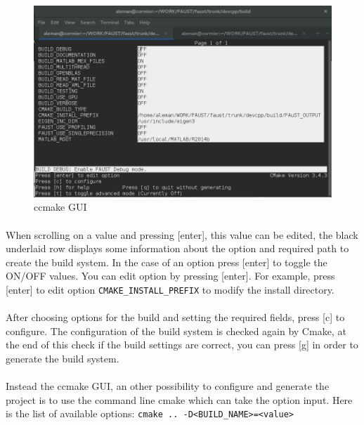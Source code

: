 \begin{itemize}
\begin{figure}[!h] %
\centering
\includegraphics[scale=0.5]{images/ccmake.jpg}
\caption{ccmake GUI}
\label{fig:ccmake}
\end{figure}

\paragraph{}When scrolling on a value and pressing [enter], this value can be edited, the black underlaid row displays some information about the option and required path to create the build system. In the case of an option press [enter] to toggle the ON/OFF values. You can edit option by pressing [enter]. For example, press [enter] to edit option \texttt{CMAKE\_INSTALL\_PREFIX} to modify the install directory. 
\paragraph{}After choosing options for the build and setting the required fields, press [c] to configure. The configuration of the build system is checked again by Cmake, at the end of this check if the build settings are correct, you can press [g] in order to generate the build system.

\paragraph{} Instead the ccmake GUI, an other possibility to configure and generate the project is to use the command line cmake which can take the option input. Here is the list of available options: 
\texttt{cmake\ ..\ -D<BUILD\_NAME>=<value>}


\end{itemize}
